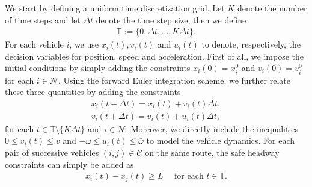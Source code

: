 \documentclass[a4paper]{report}
\theoremstyle{definition}
\theoremstyle{plain}
\begin{document}
We start by defining a uniform time discretization grid. Let $K$ denote the
number of time steps and let $\Delta t$ denote the time step size, then we
define
\begin{align*}
  \mathbb{T} := \{0, \Delta t, \dots, K \Delta t\} .
\end{align*}
%
For each vehicle $i$, we use $x_{i}(t), v_{i}(t)$ and $u_{i}(t)$ to denote,
respectively, the decision variables for position, speed and acceleration.
%
First of all, we impose the initial conditions by simply adding the constraints
$x_{i}(0) = x_{i}^{0}$ and $v_{i}(0) = v_{i}^{0}$ for each $i \in \mathcal{N}$.
%
Using the forward Euler integration scheme, we further relate these three
quantities by adding the constraints
\begin{align*}
  x_{i}(t + \Delta t) = x_{i}(t) + v_{i}(t) \Delta t , \\
  v_{i}(t + \Delta t) = v_{i}(t) + u_{i}(t) \Delta t ,
\end{align*}
for each $t \in \mathbb{T} \setminus \{K\Delta t\}$ and $i \in \mathcal{N}$. Moreover, we directly include
the inequalities $0 \leq v_{i}(t) \leq \bar{v}$ and
${-\omega} \leq u_{i}(t) \leq \bar{\omega}$ to model the vehicle dynamics.
%
For each pair of successive vehicles $(i, j) \in \mathcal{C}$ on the same route,
the safe headway constraints can simply be added as
\begin{align*}
  x_{i}(t) - x_{j}(t) \geq L \quad \text{ for each } t \in \mathbb{T}.
\end{align*}
\end{document}
